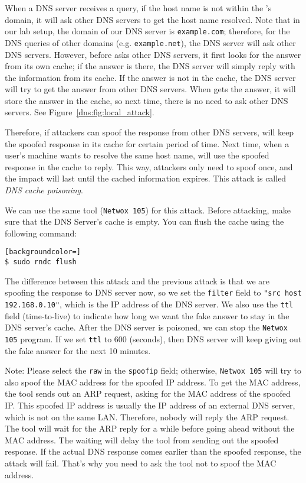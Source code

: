 When a DNS server \apollo receives a query, if the host name is not within the 
\apollo's domain,
it will ask other DNS servers to get the host name resolved. Note that in
our lab setup, the domain of our DNS server is {\tt example.com}; therefore,
for the DNS queries of other domains (e.g. \texttt{example.net}), the DNS server
\apollo will ask other DNS servers.
However, before \apollo asks other DNS servers, it first looks 
for the answer from its own cache; if the answer is there, 
the DNS server \apollo will simply reply with the information from its cache. 
If the answer is not in the cache, the DNS server will 
try to get the answer from other DNS servers. When \apollo gets the 
answer, it will store the answer in the cache, so next time, 
there is no need to ask other DNS servers. See Figure~\ref{dns:fig:local_attack}. 

Therefore, if attackers can spoof the response from other DNS 
servers, \apollo will keep the spoofed response in its cache for 
certain period of time. Next time, when a user's machine wants to resolve the 
same host name, \apollo will use the spoofed response in the cache 
to reply. This way, attackers only need to spoof once, and 
the impact will last until the cached information expires. 
This attack is called {\em DNS cache poisoning}.  


We can use the same tool (\texttt{Netwox 105}) for this attack. Before attacking, 
make sure that the DNS Server's cache is empty. 
You can flush the cache using the following command:

\begin{lstlisting}[backgroundcolor=]
$ sudo rndc flush
\end{lstlisting}

The difference between this attack and the previous attack is that 
we are spoofing the response to
DNS server now, so we set the {\tt filter} field to 
\texttt{"src host 192.168.0.10"}, 
which is the IP address of the DNS server.
We also use the {\tt ttl} field (time-to-live) 
to indicate how long we want the fake answer to 
stay in the DNS server's cache.  After the DNS server is poisoned, we can stop 
the {\tt Netwox 105} program. If we set {\tt ttl} to 600 (seconds), then DNS server will keep 
giving out the fake answer for the next 10 minutes.

Note: Please select the {\tt raw} in the {\tt spoofip} field; 
otherwise, {\tt Netwox 105} will
try to also spoof the MAC address for the spoofed IP address. To get
the MAC address, the tool sends out an ARP request, asking for the MAC
address of the spoofed IP.
This spoofed IP address is usually the IP address of an external
DNS server, which is not on the same LAN. Therefore,
nobody will reply the ARP request. The tool will wait for the ARP reply
for a while before going ahead without the MAC address.
The waiting will delay the tool from sending out the spoofed 
response. If the actual DNS response comes earlier than the spoofed response,
the attack will fail. That's why you need to ask the tool not to spoof the 
MAC address.



